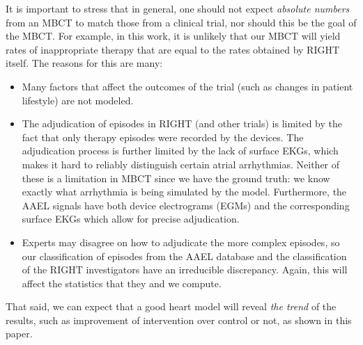 It is important to stress that in general, one should not expect \emph{absolute numbers} from an MBCT to match those from a clinical trial, nor should this be the goal of the MBCT.
For example, in this work, it is unlikely that our MBCT will yield rates of inappropriate therapy that are equal to the rates obtained by RIGHT itself.
The reasons for this are many:
\begin{itemize}
	\item Many factors that affect the outcomes of the trial (such as changes in patient lifestyle) are not modeled.
	\item The adjudication of episodes in RIGHT (and other trials) is limited by the fact that only therapy episodes were recorded by the devices.
	The adjudication process is further limited by the lack of surface EKGs, which makes it hard to reliably distinguish certain atrial arrhythmias. 
	Neither of these is a limitation in MBCT since we have the ground truth: we know exactly what arrhythmia is being simulated by the model.  Furthermore, the AAEL signals have both device electrograms (EGMs) and the corresponding surface EKGs which allow for precise adjudication.  
	\item Experts may disagree on how to adjudicate the more complex episodes, so our classification of episodes from the AAEL database and the classification of the RIGHT investigators have an irreducible discrepancy.
	Again, this will affect the statistics that they and we compute.
\end{itemize}

That said, we can expect that a good heart model will reveal \emph{the trend} of the results, such as improvement of intervention over control or not, as shown in this paper. 
